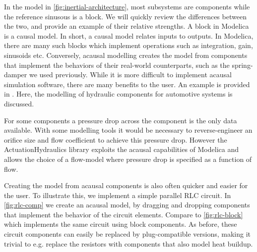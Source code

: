 \documentclass[\rootfolder/main.tex]{subfiles}
\begin{document}
In the model in \cref{fig:inertial-architecture}, most subsystems are components while the reference sinusous is a block.
We will quickly review the differences between the two, and provide an example of their relative strengths.
A block in Modelica is a causal model.
In short, a causal model relates inputs to outputs. In Modelica, there are many such blocks which implement operations such as integration, gain, sinusoids etc.
Conversely, acausal modelling creates the model from components that implement the behaviors of their real-world counterparts, such as the spring-damper we used previously.
While it is more difficult to implement acausal simulation software\cite{tiller2001}, there are many benefits to the user.
An example is provided in \cite{harman2006}.
Here, the modelling of hydraulic components for automotive systems is discussed.

\begin{displayquote}
    For some components a pressure drop across the component is the only data available.
    With some modelling tools it would be necessary to reverse-engineer an orifice size and flow coefficient to achieve this pressure drop.
    However the ActuationHydraulics library exploits the acausal capabilities of Modelica and allows the choice of a flow-model where pressure drop is specified as a function of flow.
\end{displayquote}

Creating the model from acausal components is also often quicker and easier for the user.
To illustrate this, we implement a simple parallel RLC circuit.
In \cref{fig:rlc-comp} we create an acausal model, by dragging and dropping components that implement the behavior of the circuit elements.
Compare to \cref{fig:rlc-block} which implements the same circuit using block components.
As before, these circuit components can easily be replaced by plug-compatible versions, making it trivial to e.g. replace the resistors with components that also model heat buildup.
\end{document}
